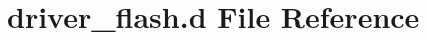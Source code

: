 \hypertarget{driver__flash_8d}{}\section{driver\+\_\+flash.\+d File Reference}
\label{driver__flash_8d}
